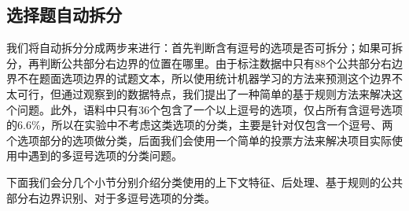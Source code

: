 \documentclass[master, winfont]{njuthesis}
\begin{document}
\subsection{选择题自动拆分}
我们将自动拆分分成两步来进行：首先判断含有逗号的选项是否可拆分；如果可拆分，再判断公共部分右边界的位置在哪里。由于标注数据中只有88个公共部分右边界不在题面选项边界的试题文本，所以使用统计机器学习的方法来预测这个边界不太可行，但通过观察到的数据特点，我们提出了一种简单的基于规则方法来解决这个问题。此外，语料中只有36个包含了一个以上逗号的选项，仅占所有含逗号选项的6.6\%，所以在实验中不考虑这类选项的分类，主要是针对仅包含一个逗号、两个选项部分的选项做分类，后面我们会使用一个简单的投票方法来解决项目实际使用中遇到的多逗号选项的分类问题。

下面我们会分几个小节分别介绍分类使用的上下文特征、后处理、基于规则的公共部分右边界识别、对于多逗号选项的分类。
\end{document}
